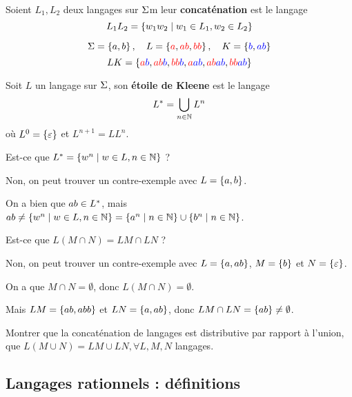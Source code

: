\begin{definition}
	Soient $L_1, L_2$ deux langages sur $\Sigma$m leur \textbf{concaténation} est le langage
	\[
		L_1L_2 = \left\{w_1w_2 \mid w_1 \in L_1, w_2 \in L_2\right\}
	\]
\end{definition}

\begin{exemple}
	$$ \Sigma = \left\{a, b\right\}, \quad L = \left\{\textcolor{red}{a}, \textcolor{red}{ab}, \textcolor{red}{bb}\right\}, \quad K = \left\{\textcolor{blue}{b}, \textcolor{blue}{ab}\right\} $$
	$$ LK = \left\{\textcolor{red}{a} \textcolor{blue}{b}, \textcolor{red}{ab} \textcolor{blue}{b}, \textcolor{red}{bb} \textcolor{blue}{b}, \textcolor{red}{a} \textcolor{blue}{ab}, \textcolor{red}{ab} \textcolor{blue}{ab}, \textcolor{red}{bb} \textcolor{blue}{ab}\right\} $$
\end{exemple}


\begin{definition}
	Soit $L$ un langage sur $\Sigma$, son \textbf{étoile de Kleene} est le langage
	$$
		L^{*} = \bigcup_{n \in \mathbb{N}} L^n
	$$
	où $L^0 = \left\{\varepsilon\right\}$ et $L^{n+1} = LL^n$.
\end{definition}

\begin{remarque}
	Est-ce que $L^{*} = \left\{w^n \mid w \in L, n \in \mathbb{N}\right\}$ ?

	Non, on peut trouver un contre-exemple avec $L = \left\{a, b\right\}$.

	On a bien que $ab \in L^{*}$, mais $ab \neq \left\{w^n \mid w \in L, n \in \mathbb{N}\right\} = \left\{a^n \mid n \in \mathbb{N}\right\} \cup \left\{b^n \mid n \in \mathbb{N}\right\}$.
\end{remarque}

\begin{remarque}
	Est-ce que $L(M \cap N) = LM \cap LN$ ?

	Non, on peut trouver un contre-exemple avec $L = \left\{a, ab\right\}$, $M = \left\{b\right\}$ et $N = \left\{\varepsilon\right\}$.

	On a que $M \cap N = \emptyset$, donc $L(M \cap N) = \emptyset$.

	Mais $LM = \left\{ab, abb\right\}$ et $LN = \left\{a, ab\right\}$, donc $LM \cap LN = \left\{ab\right\} \neq \emptyset$.
\end{remarque}

\begin{exercice}
	Montrer que la concaténation de langages est distributive par rapport à l'union, \ie que $L(M \cup N) = LM \cup LN, \forall L, M, N$ langages.
\end{exercice}

\subsection{Langages rationnels : définitions}

